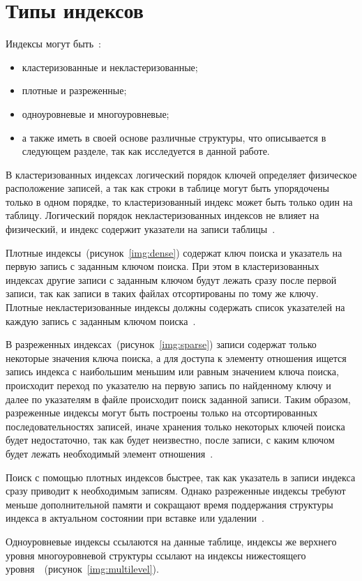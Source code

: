 \section{Типы индексов}

Индексы могут быть~\cite{ship}:
\begin{itemize}
    \item кластеризованные и некластеризованные;
    \item плотные и разреженные;
    \item одноуровневые и многоуровневые;
    \item а также иметь в своей основе различные структуры, что описывается в
        следующем разделе, так как исследуется в данной работе.
\end{itemize}

В кластеризованных индексах логический порядок ключей определяет
физическое расположение записей, а так как строки в таблице могут быть
упорядочены только в одном порядке, то кластеризованный индекс может быть
только один на таблицу. Логический порядок {некластеризованных} индексов
не влияет на физический, и индекс содержит указатели на записи
таблицы~\cite{osip}.

Плотные индексы~(рисунок~\ref{img:dense}) содержат ключ поиска и
указатель на первую запись с заданным ключом поиска. При этом в кластеризованных
индексах другие записи с заданным ключом будут лежать сразу после первой записи,
так как записи в таких файлах отсортированы по тому же ключу. Плотные
некластеризованные индексы должны содержать список указателей на каждую запись с
заданным ключом поиска~\cite{ship}.
 

В разреженных индексах~(рисунок~\ref{img:sparse}) записи содержат
только некоторые значения ключа поиска, а для доступа к элементу отношения
ищется запись индекса с наибольшим меньшим или равным значением ключа поиска,
происходит переход по указателю на первую запись по найденному ключу и далее по
указателям в файле происходит поиск заданной записи. Таким образом, разреженные
индексы могут быть построены только на отсортированных последовательностях
записей, иначе хранения только некоторых ключей поиска будет недостаточно, так
как будет неизвестно, после записи, с каким ключом будет лежать необходимый
элемент отношения~\cite{ship}.


Поиск с помощью плотных индексов быстрее, так как указатель в записи индекса
сразу приводит к необходимым записям. Однако разреженные индексы требуют меньше
дополнительной памяти и сокращают время поддержания структуры индекса в
актуальном состоянии при вставке или удалении~\cite{ship}.

Одноуровневые индексы ссылаются на данные таблице, индексы же верхнего уровня
многоуровневой структуры ссылают на индексы нижестоящего
уровня~\cite{ship}~(рисунок~\ref{img:multilevel}).


